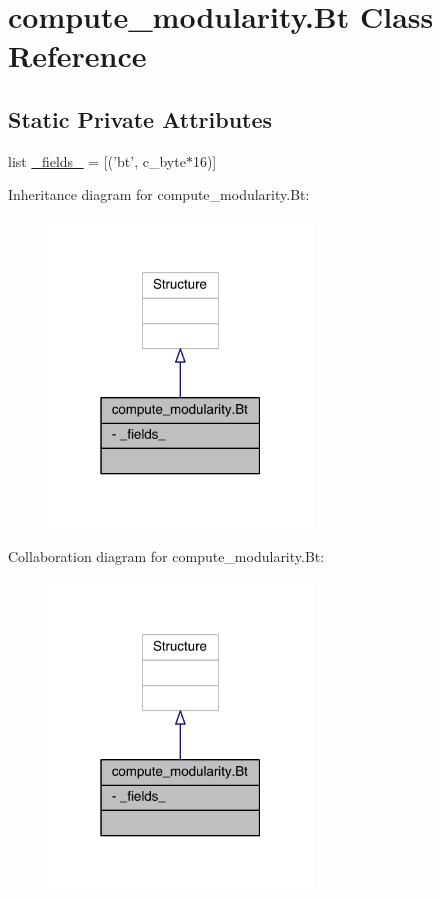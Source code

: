 \hypertarget{classcompute__modularity_1_1_bt}{\section{compute\+\_\+modularity.\+Bt Class Reference}
\label{classcompute__modularity_1_1_bt}
}
\subsection*{Static Private Attributes}
\begin{DoxyCompactItemize}
\item 
list \hyperlink{classcompute__modularity_1_1_bt_a67e24ec41d56d564d3c67e265cb9a4c3}{\+\_\+fields\+\_\+} = \mbox{[}('bt', c\+\_\+byte$\ast$16)\mbox{]}
\end{DoxyCompactItemize}


Inheritance diagram for compute\+\_\+modularity.\+Bt\+:\nopagebreak
\begin{figure}[H]
\begin{center}
\leavevmode
\includegraphics[width=199pt]{classcompute__modularity_1_1_bt__inherit__graph}
\end{center}
\end{figure}


Collaboration diagram for compute\+\_\+modularity.\+Bt\+:\nopagebreak
\begin{figure}[H]
\begin{center}
\leavevmode
\includegraphics[width=199pt]{classcompute__modularity_1_1_bt__coll__graph}
\end{center}
\end{figure}



